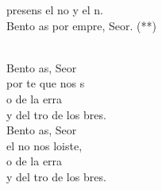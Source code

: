 \documentclass[12pt]{article}
\begin{document}
\begin{multicols*}{2}
\begin{cancion}%
	\begin{chorus}%
	 presens el no y el n.\\
	Bento as por empre, Seor. (**)\\
	\end{chorus}%
	\jump\\
	Bento as, Seor\\
	por te  que nos s\\
	o de la erra\\
	y del tro de los bres.\\
	Bento as, Seor\\
	el no  nos loiste,\\
	o de la erra\\
	y del tro de los bres.\\
\end{cancion}%


\end{multicols*}
\end{document}
